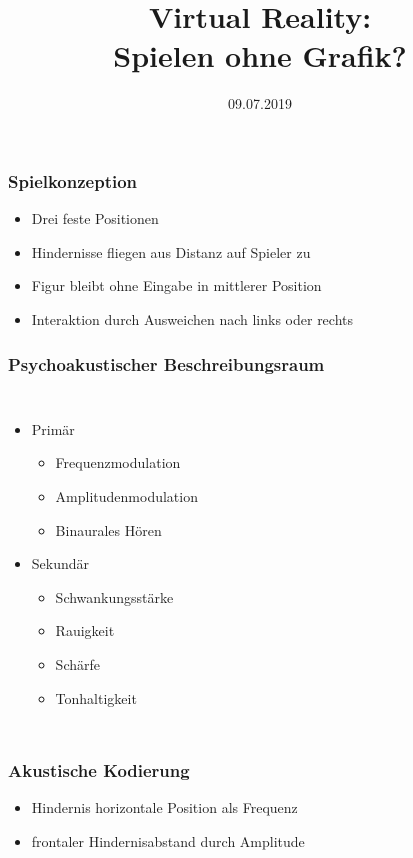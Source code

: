 \documentclass{beamer}
\title{Virtual Reality:\\Spielen ohne Grafik?}
\date{09.07.2019}
\begin{document}
\begin{frame}
\titlepage
\end{frame}

\begin{frame}
\frametitle{Spielkonzeption}

\begin{adjustbox}{max totalsize={.9\textwidth}{.7\textheight}, center}

\end{adjustbox}

\begin{itemize}
	\item Drei feste Positionen
	\item Hindernisse fliegen aus Distanz auf Spieler zu
	\item Figur bleibt ohne Eingabe in mittlerer Position
	\item Interaktion durch Ausweichen nach links oder rechts
\end{itemize}

\end{frame}

\begin{frame}
\frametitle{Psychoakustischer Beschreibungsraum}

\begin{columns}
	\begin{itemize}
		\item Primär
		\begin{itemize}
			\item Frequenzmodulation
			\item Amplitudenmodulation
			\item Binaurales Hören
		\end{itemize}

		\item Sekundär
		\begin{itemize}
			\item Schwankungsstärke
			\item Rauigkeit
			\item Schärfe
			\item Tonhaltigkeit
		\end{itemize}
	\end{itemize}
	
\end{columns}
\end{frame}

\begin{frame}
\frametitle{Akustische Kodierung}
\begin{itemize}
	\item Hindernis horizontale Position als Frequenz
	\item frontaler Hindernisabstand durch Amplitude
\end{itemize}
\end{frame}
\end{document}
